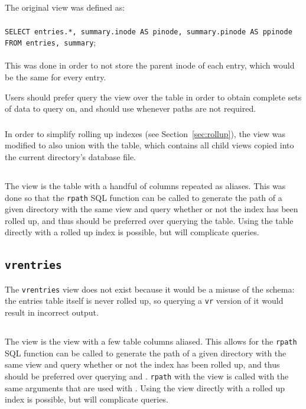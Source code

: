 \subsection{\pentries}
The original \pentries view was defined as:
\\\\
\texttt{SELECT entries.*, summary.inode AS pinode, summary.pinode AS
  ppinode FROM entries, summary};
\\\\
This was done in order to not store the parent inode of each entry,
which would be the same for every entry.

Users should prefer query the \pentries view over the \entries table
in order to obtain complete sets of data to query on, and should use
\pentries whenever paths are not required.

\subsubsection{\pentriesrollup}
In order to simplify rolling up indexes (see
Section~\ref{sec:rollup}), the \pentries view was modified to also
union with the \pentriesrollup table, which contains all child
\pentries views copied into the current directory's database file.

\subsection{\vrsummary}
The \vrsummary view is the \summary table with a handful of columns
repeated as aliases. This was done so that the \texttt{rpath} SQL
function can be called to generate the path of a given directory with
the same view and query whether or not the index has been rolled up,
and thus should be preferred over querying the \summary table. Using
the \summary table directly with a rolled up index is possible, but
will complicate queries.

\subsection{\texttt{vrentries}}
The \texttt{vrentries} view does not exist because it would be a
misuse of the schema: the entries table itself is never rolled up, so
querying a \texttt{vr} version of it would result in incorrect output.

\subsection{\vrpentries}
The \vrpentries view is the \pentries view with a few \summary table
columns aliased. This allows for the \texttt{rpath} SQL function can
be called to generate the path of a given directory with the same view
and query whether or not the index has been rolled up, and thus should
be preferred over querying \entries and \pentries. \texttt{rpath} with
the \vrpentries view is called with the same arguments that are used
with \vrsummary. Using the \pentries view directly with a rolled up
index is possible, but will complicate queries.

